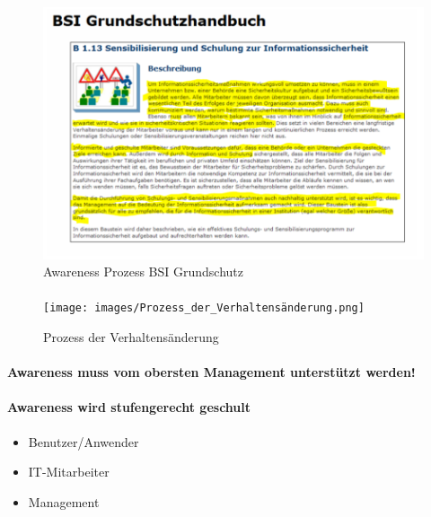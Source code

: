 \documentclass[10pt,a4paper]{article}
\begin{document}
\paragraph*{}
\begin{figure}[H]
    \begin{center}
    \includegraphics[width=15cm]{images/Awareness_Prozess_BSI.png}
    \caption{Awareness Prozess BSI Grundschutz}
    \label{Awareness Prozess BSI Grundschutz}
    \end{center}
\end{figure}

\paragraph*{}
\begin{figure}[H]
    \begin{center}
    \texttt{[image: images/Prozess\_der\_Verhaltensänderung.png]}
    \caption{Prozess der Verhaltensänderung}
    \label{Prozess der Verhaltensaenderung}
    \end{center}
\end{figure}

\paragraph*{Awareness muss vom obersten Management unterstützt werden!}
\paragraph*{Awareness wird stufengerecht geschult}
\begin{itemize}[noitemsep,topsep=0pt,leftmargin=*]
    \item Benutzer/Anwender
    \item IT-Mitarbeiter
    \item Management
\end{itemize}
\end{document}
